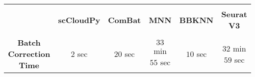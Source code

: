 \documentclass{article}
\begin{document}
\begin{center}
\begin{tabular}{|c|c|c|c|c|c|}\hline
& & & & & \\[-10pt]
 & \textbf{scCloudPy} & \textbf{ComBat} & \textbf{MNN} & \textbf{BBKNN} & \textbf{Seurat V3}\\[2pt]\hline
 & & & & & \\[-10pt]
 \textbf{Batch Correction Time} & $2$ sec & $20$ sec & $33$ min $55$ sec & $10$ sec & $32$ min $59$ sec  \\[2pt]\hline
\end{tabular}
\end{center}
\end{document}
